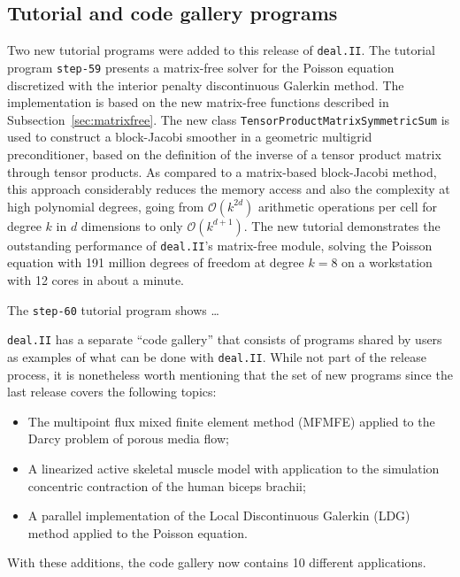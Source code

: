 \documentclass{ansarticle-preprint}
\newcommand{\specialword}[1]{\texttt{#1}}
\newcommand{\dealii}{{\specialword{deal.II}}\xspace}
\begin{document}
\subsection{Tutorial and code gallery programs}

Two new tutorial programs were added to this release of \dealii{}. The
tutorial program \texttt{step-59} presents a matrix-free solver for the
Poisson equation discretized with the interior penalty discontinuous Galerkin
method. The implementation is based on the new matrix-free functions described
in Subsection~\ref{sec:matrixfree}. The new class
\texttt{TensorProductMatrixSymmetricSum} is used to construct a block-Jacobi
smoother in a geometric multigrid preconditioner, based on the definition of
the inverse of a tensor product matrix through tensor products. As compared to
a matrix-based block-Jacobi method, this approach considerably reduces the
memory access and also the complexity at high polynomial degrees, going from
$\mathcal O(k^{2d})$ arithmetic operations per cell for degree $k$ in $d$
dimensions to only $\mathcal O(k^{d+1})$. The new tutorial demonstrates the
outstanding performance of \dealii{}'s matrix-free module, solving the Poisson
equation with 191 million degrees of freedom at degree $k=8$ on a workstation
with 12 cores in about a minute.

The \texttt{step-60} tutorial program shows \ldots

\dealii has a separate ``code gallery'' that
consists of programs shared by users as examples of what can be
done with \dealii. While not part of the release process, it is nonetheless
worth mentioning that the set of new programs since the last release covers
the following topics:
\begin{itemize}
\item The multipoint flux mixed finite element method (MFMFE) applied
  to the Darcy problem of porous media flow;
\item A linearized active skeletal muscle model with application to
  the simulation concentric contraction of the human biceps brachii;
\item A parallel implementation of the Local Discontinuous Galerkin
  (LDG) method applied to the Poisson equation.
\end{itemize}
With these additions, the code gallery now contains 10 different applications.


\end{document}
